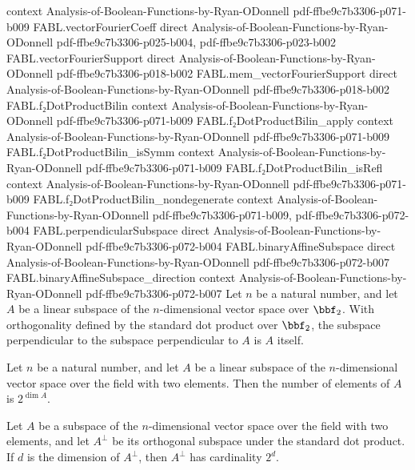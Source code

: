 \begin{theorem}
  {context}
  {Analysis-of-Boolean-Functions-by-Ryan-ODonnell}
  {pdf-ffbe9c7b3306-p071-b009}
\proofstep
  {FABL.vectorFourierCoeff}
  {direct}
  {Analysis-of-Boolean-Functions-by-Ryan-ODonnell}
  {pdf-ffbe9c7b3306-p025-b004,
    pdf-ffbe9c7b3306-p023-b002}
\proofstep
  {FABL.vectorFourierSupport}
  {direct}
  {Analysis-of-Boolean-Functions-by-Ryan-ODonnell}
  {pdf-ffbe9c7b3306-p018-b002}
\proofstep
  {FABL.mem_vectorFourierSupport}
  {direct}
  {Analysis-of-Boolean-Functions-by-Ryan-ODonnell}
  {pdf-ffbe9c7b3306-p018-b002}
\proofstep
  {FABL.f₂DotProductBilin}
  {context}
  {Analysis-of-Boolean-Functions-by-Ryan-ODonnell}
  {pdf-ffbe9c7b3306-p071-b009}
\proofstep
  {FABL.f₂DotProductBilin_apply}
  {context}
  {Analysis-of-Boolean-Functions-by-Ryan-ODonnell}
  {pdf-ffbe9c7b3306-p071-b009}
\proofstep
  {FABL.f₂DotProductBilin_isSymm}
  {context}
  {Analysis-of-Boolean-Functions-by-Ryan-ODonnell}
  {pdf-ffbe9c7b3306-p071-b009}
\proofstep
  {FABL.f₂DotProductBilin_isRefl}
  {context}
  {Analysis-of-Boolean-Functions-by-Ryan-ODonnell}
  {pdf-ffbe9c7b3306-p071-b009}
\proofstep
  {FABL.f₂DotProductBilin_nondegenerate}
  {context}
  {Analysis-of-Boolean-Functions-by-Ryan-ODonnell}
  {pdf-ffbe9c7b3306-p071-b009,
    pdf-ffbe9c7b3306-p072-b004}
\proofstep
  {FABL.perpendicularSubspace}
  {direct}
  {Analysis-of-Boolean-Functions-by-Ryan-ODonnell}
  {pdf-ffbe9c7b3306-p072-b004}
\proofstep
  {FABL.binaryAffineSubspace}
  {direct}
  {Analysis-of-Boolean-Functions-by-Ryan-ODonnell}
  {pdf-ffbe9c7b3306-p072-b007}
\proofstep
  {FABL.binaryAffineSubspace_direction}
  {context}
  {Analysis-of-Boolean-Functions-by-Ryan-ODonnell}
  {pdf-ffbe9c7b3306-p072-b007}
Let $n$ be a natural number, and let $A$ be a linear subspace of the $n$-dimensional
vector space over $\bbf_2$. With orthogonality defined by the standard dot product over
$\bbf_2$, the subspace perpendicular to the subspace perpendicular to $A$ is $A$ itself.
\end{theorem}

\begin{theorem}
\label{FABL.card_submodule_eq_two_pow_finrank}
\leanok
{}
Let $n$ be a natural number, and let $A$ be a linear subspace of the $n$-dimensional
vector space over the field with two elements. Then the number of elements of $A$ is
$2^{\dim A}$.
\end{theorem}

\begin{theorem}
\label{FABL.card_perpendicularSubspace}
\leanok
{}
Let $A$ be a subspace of the $n$-dimensional vector space over the field with two
elements, and let $A^\perp$ be its orthogonal subspace under the standard dot product.
If $d$ is the dimension of $A^\perp$, then $A^\perp$ has cardinality $2^d$.
\end{theorem}

